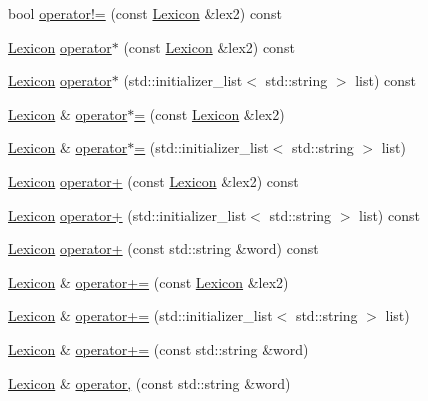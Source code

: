 \begin{DoxyCompactItemize}
\item 
bool \mbox{\hyperlink{classLexicon_af42d8a30a8c4b2d33a6be3b12258e152}{operator!=}} (const \mbox{\hyperlink{classLexicon}{Lexicon}} \&lex2) const
\item 
\mbox{\hyperlink{classLexicon}{Lexicon}} \mbox{\hyperlink{classLexicon_a62286f0f5d7c1229b3003b855bf54ba3}{operator$\ast$}} (const \mbox{\hyperlink{classLexicon}{Lexicon}} \&lex2) const
\item 
\mbox{\hyperlink{classLexicon}{Lexicon}} \mbox{\hyperlink{classLexicon_a5da3a8f0f6332bccefe7b2cb48d8a8d6}{operator$\ast$}} (std\+::initializer\+\_\+list$<$ std\+::string $>$ list) const
\item 
\mbox{\hyperlink{classLexicon}{Lexicon}} \& \mbox{\hyperlink{classLexicon_ab81e3c0d6a5637202849784ef00b9cd5}{operator$\ast$=}} (const \mbox{\hyperlink{classLexicon}{Lexicon}} \&lex2)
\item 
\mbox{\hyperlink{classLexicon}{Lexicon}} \& \mbox{\hyperlink{classLexicon_a79ada3cb64d9f074114ce895c67be781}{operator$\ast$=}} (std\+::initializer\+\_\+list$<$ std\+::string $>$ list)
\item 
\mbox{\hyperlink{classLexicon}{Lexicon}} \mbox{\hyperlink{classLexicon_acfc41a903b549304f3b70e48fd2e52e4}{operator+}} (const \mbox{\hyperlink{classLexicon}{Lexicon}} \&lex2) const
\item 
\mbox{\hyperlink{classLexicon}{Lexicon}} \mbox{\hyperlink{classLexicon_a4436a915b6de75438364ed061e0e9491}{operator+}} (std\+::initializer\+\_\+list$<$ std\+::string $>$ list) const
\item 
\mbox{\hyperlink{classLexicon}{Lexicon}} \mbox{\hyperlink{classLexicon_a44774af5311cf2c8fd054ecf8ff8e76b}{operator+}} (const std\+::string \&word) const
\item 
\mbox{\hyperlink{classLexicon}{Lexicon}} \& \mbox{\hyperlink{classLexicon_afa70421c28007f127e7c4b24666ecc3a}{operator+=}} (const \mbox{\hyperlink{classLexicon}{Lexicon}} \&lex2)
\item 
\mbox{\hyperlink{classLexicon}{Lexicon}} \& \mbox{\hyperlink{classLexicon_a3080ac30a072160945adc5f860ca1785}{operator+=}} (std\+::initializer\+\_\+list$<$ std\+::string $>$ list)
\item 
\mbox{\hyperlink{classLexicon}{Lexicon}} \& \mbox{\hyperlink{classLexicon_a051f30ebfa7b8fbb7ea1dc5af23d3004}{operator+=}} (const std\+::string \&word)
\item 
\mbox{\hyperlink{classLexicon}{Lexicon}} \& \mbox{\hyperlink{classLexicon_a75f32eb2f65c3c3968193cfd72bdfd1a}{operator,}} (const std\+::string \&word)

\end{DoxyCompactItemize}
